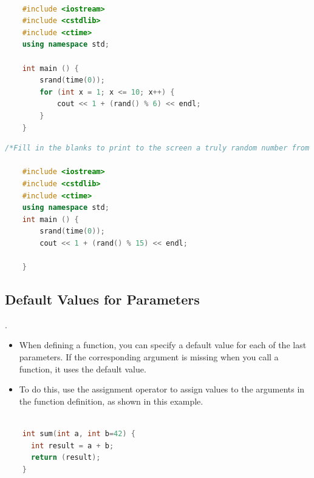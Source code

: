 \documentclass[12pt , a4paper]{article}
\begin{document}
	\begin{lstlisting}[language=C++]

	#include <iostream>
	#include <cstdlib>
	#include <ctime>
	using namespace std;
	
	int main () {
	    srand(time(0));
	    for (int x = 1; x <= 10; x++) {
	        cout << 1 + (rand() % 6) << endl;
	    }
	}
	\end{lstlisting}
	\begin{lstlisting}[language=C++]
	/*Fill in the blanks to print to the screen a truly random number from 1 through 15, generated by the rand() function.*/

	#include <iostream>
	#include <cstdlib>
	#include <ctime>
	using namespace std;
	int main () {
	    srand(time(0));
	    cout << 1 + (rand() % 15) << endl;

	}
	\end{lstlisting}


	\subsection{Default Values for Parameters}.
	\begin{itemize}
		\item When defining a function, you can specify a default value for each of the last parameters. If the corresponding argument is missing when you call a function, it uses the default value.\\
		\item To do this, use the assignment operator to assign values to the arguments in the function definition, as shown in this example.\\
	\end{itemize}



	\begin{lstlisting}[language=C++]

	int sum(int a, int b=42) {
	  int result = a + b;
	  return (result);
	}
	\end{lstlisting}
\end{document}
